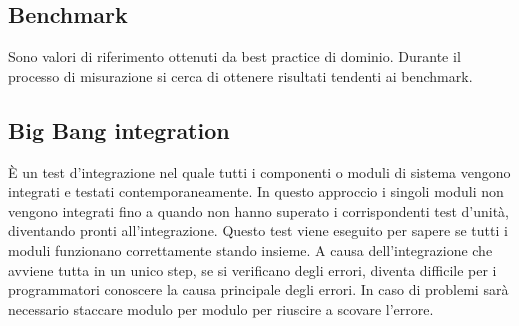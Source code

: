     \subsection*{Benchmark}

		Sono valori di riferimento ottenuti da best practice di dominio. Durante il processo di misurazione si cerca di ottenere risultati tendenti ai benchmark.

    \subsection*{Big Bang integration}

        È un test d'integrazione nel quale tutti i componenti o moduli di sistema vengono integrati e testati contemporaneamente.
        In questo approccio i singoli moduli non vengono integrati fino a quando non hanno superato i corrispondenti test
        d'unità, diventando pronti all'integrazione. Questo test viene eseguito per sapere se tutti i moduli funzionano correttamente
        stando insieme. A causa dell'integrazione che avviene tutta in un unico step, se si verificano degli errori, diventa difficile
        per i programmatori conoscere la causa principale degli errori. In caso di problemi sarà necessario staccare modulo per modulo
        per riuscire a scovare l'errore.
